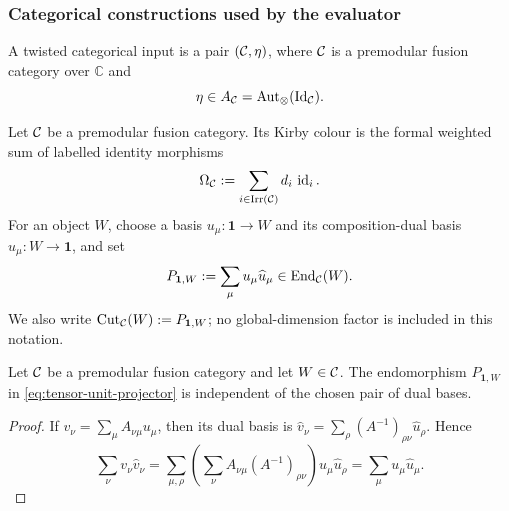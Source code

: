 \subsubsection{Categorical constructions used by the evaluator}
\label{subsec:categorical-evaluator-constructions}

\begin{definition}
\label{def:twisted-categorical-input}
A twisted categorical input is a pair \((\mathcal{C},\eta)\), where \(\mathcal{C}\) is a
premodular fusion category over \(\mathbb C\) and
\[
  \eta\in A_{\mathcal{C}}
  =\operatorname{Aut}_{\otimes}(\operatorname{Id}_{\mathcal{C}}).
\]
\end{definition}

\begin{definition}
\label{def:kirby-colour}
\label{def:tensor-unit-projector}
Let \(\mathcal{C}\) be a premodular fusion category.  Its Kirby colour is
the formal weighted sum of labelled identity morphisms
\begin{equation}
  \Omega_{\mathcal{C}}:=
  \sum_{i\in\operatorname{Irr}(\mathcal{C})}d_i\,\operatorname{id}_i.
  \label{eq:kirby-colour}
\end{equation}
For an object \(W\), choose a basis
\(u_\mu\colon\mathbf1\to W\) and its composition-dual basis
\(\widehat u_\mu\colon W\to\mathbf1\), and set
\begin{equation}
  P_{\mathbf1,W}:=
  \sum_\mu u_\mu\widehat u_\mu
  \in\operatorname{End}_{\mathcal{C}}(W).
  \label{eq:tensor-unit-projector}
\end{equation}
We also write
\(\operatorname{Cut}_{\mathcal{C}}(W):=P_{\mathbf1,W}\); no global-dimension factor is
included in this notation.
\end{definition}

\begin{lemma}
\label{lem:tensor-unit-projector-basis-independence}
Let \(\mathcal{C}\) be a premodular fusion category and let \(W\in\mathcal{C}\).
The endomorphism \(P_{\mathbf1,W}\) in
\eqref{eq:tensor-unit-projector} is independent of the chosen pair of dual
bases.
\end{lemma}

\begin{proof}
If \(v_\nu=\sum_\mu A_{\nu\mu}u_\mu\), then its dual basis is
\(\widehat v_\nu=\sum_\rho(A^{-1})_{\rho\nu}\widehat u_\rho\).  Hence
\[
  \sum_\nu v_\nu\widehat v_\nu
  =\sum_{\mu,\rho}
    \left(\sum_\nu A_{\nu\mu}(A^{-1})_{\rho\nu}\right)
    u_\mu\widehat u_\rho
  =\sum_\mu u_\mu\widehat u_\mu.
\]
\end{proof}

